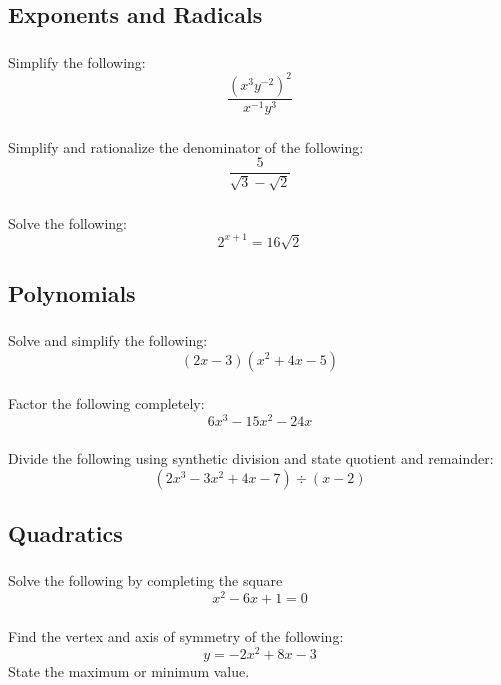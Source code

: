 \documentclass[12pt]{article}
\begin{document}
		\subsection{Exponents and Radicals}
			\subsubsection{}
				Simplify the following:
				\[\frac{(x^3y^{-2})^2}{x^{-1}y^3}\]
			\subsubsection{}
				Simplify and rationalize the denominator of the following:
				\[\frac{5}{\sqrt{3}-\sqrt{2}}\]
			\subsubsection{}
				Solve the following:
				\[2^{x+1}=16\sqrt{2}\]

		\subsection{Polynomials}
			\subsubsection{}
				Solve and simplify the following:
				\[(2x-3)(x^2+4x-5)\]
			\subsubsection{}
				Factor the following completely:
				\[6x^3-15x^2-24x\]
			\subsubsection{}
				Divide the following using synthetic division and state quotient and remainder:
				\[(2x^3-3x^2+4x-7)\div(x-2)\]

		\subsection{Quadratics}
			\subsubsection{}
				Solve the following by completing the square
				\[x^2-6x+1=0\]
			\subsubsection{}
				Find the vertex and axis of symmetry of the following:
				\[y=-2x^2+8x-3\]
				State the maximum or minimum value.
\end{document}
